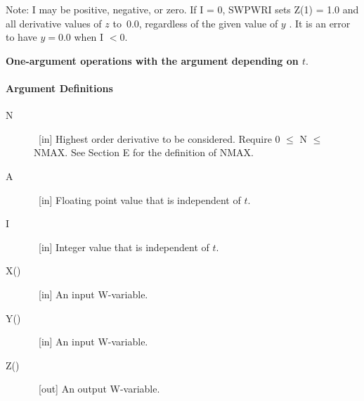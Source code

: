 \documentclass[twoside]{MATH77}
\begin{document}
Note: I may be positive, negative, or zero. If I = 0, SWPWRI sets Z(1) = 1.0
and all derivative values of $z$ to~0.0, regardless of the given value of $y$%
. It is an error to have $y = 0.0$ when I $< 0.$

\begin{center}
{\bf One-argument operations with the argument depending on $t.$}

\end{center}

\paragraph{Argument Definitions}

\begin{description}
\item[N]  \ [in] Highest order derivative to be considered. Require 0 $\leq $
N $\leq $ NMAX. See Section E for the definition of NMAX.

\item[A]  \ [in] Floating point value that is independent of $t.$

\item[I]  \ [in] Integer value that is independent of $t.$

\item[X()]  \ [in] An input W-variable.

\item[Y()]  \ [in] An input W-variable.

\item[Z()]  \ [out] An output W-variable.
\end{description}
\end{document}
